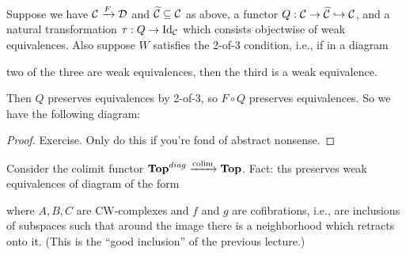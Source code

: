 \documentclass[class=report, crop=false,a4paper,twoside]{standalone}
\begin{document}
\begin{theorem}\label{Right_Kan_Extension}
	Suppose we have $\mathcal{C} \xrightarrow{F} \mathcal{D}$ and $\widetilde{\mathcal{C}} \subseteq \mathcal{C}$ as above, a functor $Q: \mathcal{C} \to \widetilde{\mathcal{C}} \hookrightarrow \mathcal{C}$, and a natural transformation $\tau: Q \to \operatorname{Id}_{\mathcal{C}}$ which consists objectwise of weak equivalences.
	Also suppose $W$ satisfies the 2-of-3 condition, i.e., if in a diagram
	\begin{center}
	\end{center}
	two of the three are weak equivalences, then the third is a weak equivalence.

	Then $Q$ preserves equivalences by 2-of-3, so $F \circ Q$ preserves equivalences. So we have the following diagram:
	\begin{center}
	\end{center}
\end{theorem}

\begin{proof}
	Exercise. Only do this if you're fond of abstract nonsense.
\end{proof}

\begin{example}
	Consider the colimit functor $\mathbf{Top}^{diag} \xrightarrow{\operatorname{colim}}\mathbf{Top}$. Fact: ths preserves weak equivalences of diagram of the form
	\begin{center}
	\end{center}
	where $A,B,C$ are CW-complexes and $f$ and $g$ are cofibrations, i.e., are inclusions of subspaces such that around the image there is a neighborhood which retracts onto it. (This is the ``good inclusion'' of the previous lecture.)
\end{example}
\end{document}
